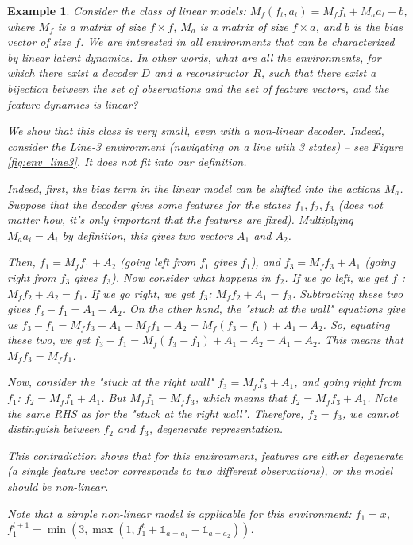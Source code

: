 \documentclass[a4paper,11pt,oneside]{report}
\newtheorem{example}{Example}[section]
\begin{document}
\begin{example}
    Consider the class of linear models: $M_f(f_t,a_t)=M_ff_t+M_aa_t+b$, where $M_f$ is a matrix of size $f\times f$, $M_a$ is a matrix of size $f\times a$, and $b$ is the bias vector of size $f$. We are interested in all environments that can be characterized by linear latent dynamics. In other words, what are all the environments, for which there exist a decoder $D$ and a reconstructor $R$, such that there exist a bijection between the set of observations and the set of feature vectors, and the feature dynamics is linear?

    We show that this class is very small, even with a non-linear decoder. Indeed, consider the Line-3 environment (navigating on a line with 3 states) -- see Figure \ref{fig:env_line3}. It does not fit into our definition.

    Indeed, first, the bias term in the linear model can be shifted into the actions $M_a$. Suppose that the decoder gives some features for the states $f_1, f_2, f_3$ (does not matter how, it's only important that the features are fixed). Multiplying $M_aa_i=A_i$ by definition, this gives two vectors $A_1$ and $A_2$.

    Then, $f_1=M_ff_1+A_2$ (going left from $f_1$ gives $f_1$), and $f_3=M_ff_3+A_1$ (going right from $f_3$ gives $f_3$). Now consider what happens in $f_2$. If we go left, we get $f_1$: $M_ff_2+A_2=f_1$. If we go right, we get $f_3$: $M_ff_2+A_1=f_3$. Subtracting these two gives $f_3-f_1=A_1-A_2$. On the other hand, the "stuck at the wall" equations give us $f_3-f_1=M_ff_3+A_1-M_ff_1-A_2=M_f(f_3-f_1)+A_1-A_2$. So, equating these two, we get
    $f_3-f_1=M_f(f_3-f_1)+A_1-A_2=A_1-A_2$. This means that $M_ff_3=M_ff_1$.

    Now, consider the "stuck at the right wall" $f_3=M_ff_3+A_1$, and going right from $f_1$: $f_2=M_ff_1+A_1$. But $M_ff_1=M_ff_3$, which means that $f_2=M_ff_3+A_1$. Note the same RHS as for the "stuck at the right wall". Therefore, $f_2=f_3$, {\em we cannot distinguish between $f_2$ and $f_3$, degenerate representation.}

    This contradiction shows that for this environment, features are either {\em degenerate} (a single feature vector corresponds to two different observations), or the model should be non-linear.

    Note that a simple non-linear model is applicable for this environment:
    $f_1=x$, $f_1^{t+1}=\min(3, \max(1, f_1^t+\mathds 1_{a=a_1}-\mathds 1_{a=a_2}))$.
\end{example}
\end{document}
